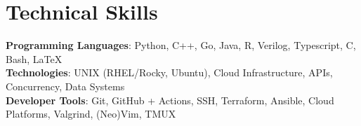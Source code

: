 \documentclass[letterpaper,11pt]{article}
\begin{document}
\section{Technical Skills}
 \begin{itemize}[leftmargin=0.15in, label={}]
    \small{\item{
     \textbf{Programming Languages}{: Python, C++, Go, Java, R, Verilog, Typescript, C, Bash, \LaTeX} \\
     \textbf{Technologies}{: UNIX (RHEL/Rocky, Ubuntu), Cloud Infrastructure, APIs, Concurrency, Data Systems } \\
    \textbf{Developer Tools}{: Git, GitHub + Actions, SSH, Terraform, Ansible, Cloud Platforms, Valgrind, (Neo)Vim, TMUX} \\
    }}
 \end{itemize}
\end{document}
